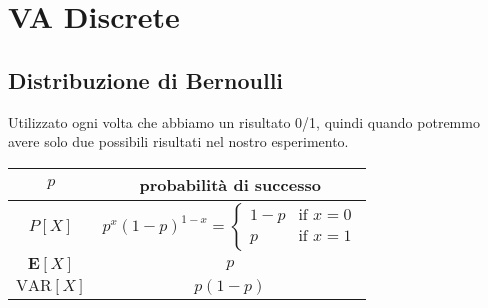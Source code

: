 \chapter{VA Discrete}

\section{Distribuzione di Bernoulli}
\begin{tcolorbox}
Utilizzato ogni volta che abbiamo un risultato 0/1, quindi quando potremmo avere solo due possibili risultati nel nostro esperimento.
\end{tcolorbox}

\begingroup
\setlength{\tabcolsep}{10pt} %
\renewcommand{\arraystretch}{1.5} %
\begin{center}
\begin{tabular}{ |c|c| } 
\hline
\(p\) & probabilità di successo \\ \hline
\(P[X]\) & $p^x(1 - p)^{1-x} = \begin{cases} 1 - p & \mbox{if } x = 0 \\p & \mbox{if } x = 1 
\end{cases}$ \\ \hline
\(\mathbf{E}[X]\) & $p$ \\ \hline
\(\text{VAR}[X]\) & $p(1 - p)$ \\ \hline
\end{tabular}
\end{center}
\endgroup






